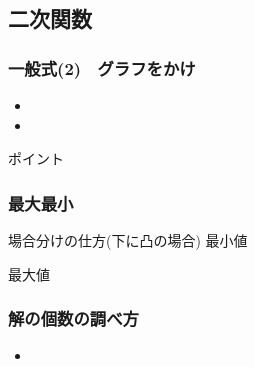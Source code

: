 \documentclass[10pt,dvipdfmx]{jsarticle}
\begin{document}
\newpage
\subsection*{二次関数}
\subsubsection*{一般式(2)　グラフをかけ}
\begin{large}
  \begin{itemize}
    \item
    \item
  \end{itemize}
\end{large}

\begin{itembox}[l]{ポイント}
  \vspace{8mm}
\end{itembox}



\subsubsection*{最大最小}
\begin{itembox}[l]{場合分けの仕方(下に凸の場合)}
  最小値
  \vspace{5cm}

  最大値\vspace{5cm}


\end{itembox}

\subsubsection*{解の個数の調べ方}
\begin{large}
  \begin{itemize}
    \item
  \end{itemize}
\end{large}
\end{document}

